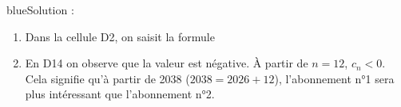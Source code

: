 \begin{color}{blue}Solution :\par
\begin{enumerate}
\item Dans la cellule {\helvbx D2}, on saisit la formule 
\item En {\helvbx D14} on observe que la valeur est négative. À partir de $n=12$, $c_{n} <0$. Cela signifie qu'à partir de 2038 ($2038=2026+12$), l'abonnement n°1 sera plus intéressant que l'abonnement n°2.
\end{enumerate}
\end{color}
